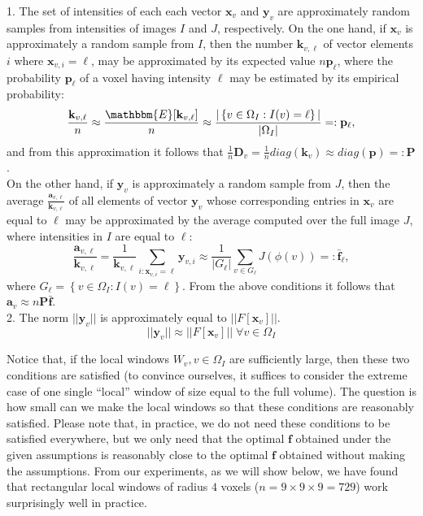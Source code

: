 1. The set of intensities of each each vector $\mathbf{x}_{v}$ and $\mathbf{y}_{v}$ are approximately random samples from intensities of images $I$ and $J$, respectively. On the one hand, if $\mathbf{x}_{v}$ is approximately a random sample from $I$, then the number $\mathbf{k}_{v,\ell}$ of vector elements $i$ where $\mathbf{x}_{v,i} = \ell$, may be approximated by its expected value $n\mathbf{p}_{\ell}$, where the probability $\mathbf{p}_{\ell}$ of a voxel having intensity $\ell$ may be estimated by its empirical probability:
\begin{equation}
    \frac{\mathbf{k}_{v, \ell}}{n} \approx \frac{\mathbbm{E}[\mathbf{k}_{v,\ell}]}{n} \approx \frac{|\left\lbrace v\in\Omega_{I} : I(v) = \ell\right\rbrace|}{|\Omega_{I}|} =: \mathbf{p}_{\ell},
\end{equation}
and from this approximation it follows that $\frac{1}{n}\mathbf{D}_{v} = \frac{1}{n}diag(\mathbf{k}_{v}) \approx diag(\mathbf{p}) =: \mathbf{P}$.\\

On the other hand, if $\mathbf{y}_{v}$ is approximately a random sample from $J$, then the average $\frac{\mathbf{a}_{v,\ell}}{\mathbf{k}_{v,\ell}}$ of all elements of vector $\mathbf{y}_{v}$ whose corresponding entries in $\mathbf{x}_{v}$ are equal to $\ell$ may be approximated by the average computed over the full image $J$, where intensities in $I$ are equal to $\ell$:
\begin{equation}\label{eq:average_of_isosets}
    \frac{\mathbf{a}_{v,\ell}}{\mathbf{k}_{v,\ell}} =  \frac{1}{\mathbf{k}_{v,\ell}}\sum_{i:\mathbf{x}_{v,i}=\ell} \mathbf{y}_{v,i} \approx \frac{1}{|G_{\ell}|}\sum_{v\in G_{\ell}} J(\phi(v))
    =:\bar{\mathbf{f}}_{\ell},
\end{equation}
where $G_{\ell} = \left\lbrace v\in \Omega_{I}: I(v) = \ell\right\rbrace$. From the above conditions it follows that $\mathbf{a}_{v} \approx n \mathbf{P} \mathbf{\bar{f}}$.\\

2. The norm $||\mathbf{y}_{v}||$ is approximately equal to $||F[\mathbf{x}_{v}]||$.
\begin{equation}
    ||\mathbf{y}_{v}|| \approx ||F[\mathbf{x}_{v}]|| \; \forall v\in\Omega_{I}
\end{equation}

Notice that, if the local windows $W_{v}, v\in\Omega_{I}$ are sufficiently large, then these two conditions are satisfied (to convince ourselves, it suffices to consider the extreme case of one single ``local'' window of size equal to the full volume). The question is how small can we make the local windows so that these conditions are reasonably satisfied. Please note that, in practice, we do not need these conditions to be satisfied everywhere, but we only need that the optimal $\mathbf{f}$ obtained under the given assumptions is reasonably close to the optimal $\mathbf{f}$ obtained without making the assumptions. From our experiments, as we will show below, we have found that rectangular local windows of radius $4$ voxels ($n=9\times 9\times 9 = 729$) work surprisingly well in practice.\\

